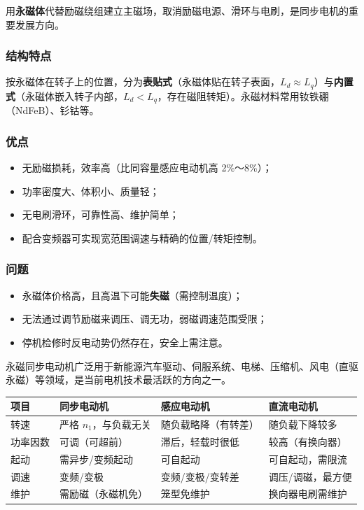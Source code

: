 用\textbf{永磁体}代替励磁绕组建立主磁场，取消励磁电源、滑环与电刷，是同步电机的重要发展方向。

\subsubsection{结构特点}
按永磁体在转子上的位置，分为\textbf{表贴式}（永磁体贴在转子表面，$L_d\approx L_q$）与\textbf{内置式}（永磁体嵌入转子内部，$L_d<L_q$，存在磁阻转矩）。永磁材料常用钕铁硼（NdFeB）、钐钴等。

\subsubsection{优点}
\begin{itemize}
  \item 无励磁损耗，效率高（比同容量感应电动机高 2\%～8\%）；
  \item 功率密度大、体积小、质量轻；
  \item 无电刷滑环，可靠性高、维护简单；
  \item 配合变频器可实现宽范围调速与精确的位置/转矩控制。
\end{itemize}

\subsubsection{问题}
\begin{itemize}
  \item 永磁体价格高，且高温下可能\textbf{失磁}（需控制温度）；
  \item 无法通过调节励磁来调压、调无功，弱磁调速范围受限；
  \item 停机检修时反电动势仍然存在，安全上需注意。
\end{itemize}
永磁同步电动机广泛用于新能源汽车驱动、伺服系统、电梯、压缩机、风电（直驱永磁）等领域，是当前电机技术最活跃的方向之一。

\begin{center}
\begin{tabular}{@{}p{2.2cm}p{3.6cm}p{3.8cm}p{3.4cm}@{}}
\toprule
项目 & 同步电动机 & 感应电动机 & 直流电动机 \\
\midrule
转速 & 严格 $n_1$，与负载无关 & 随负载略降（有转差） & 随负载下降较多 \\
功率因数 & 可调（可超前） & 滞后，轻载时很低 & 较高（有换向器） \\
起动 & 需异步/变频起动 & 可自起动 & 可自起动，需限流 \\
调速 & 变频/变极 & 变频/变极/变转差 & 调压/调磁，最方便 \\
维护 & 需励磁（永磁机免） & 笼型免维护 & 换向器电刷需维护 \\
\bottomrule
\end{tabular}
\end{center}
